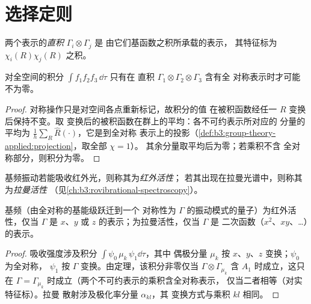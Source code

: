 \section{选择定则}

\begin{definition}[直积]\label{def:b3:group-theory-applied:direct-product}
两个表示的\emph{直积} $\Gamma_i\otimes\Gamma_j$ 是
由它们基函数之积所承载的表示，
其特征标为 $\chi_i(R)\chi_j(R)$ 之积。
\end{definition}

\begin{theorem}[积分为零]\label{thm:b3:group-theory-applied:vanishing-integral}
对全空间的积分 $\int f_1f_2f_3\,\dd\tau$ 只有在
直积 $\Gamma_1\otimes\Gamma_2\otimes\Gamma_3$ 含有全
对称表示时才可能不为零。
\end{theorem}

\begin{proof}
对称操作只是对空间各点重新标记，故积分的值
在被积函数经任一 $R$ 变换后保持不变。取
变换后的被积函数在群上的平均：各不可约表示所对应的
分量的平均为
$\frac1h\sum_R\hat R(\cdot)$，它是到全对称
表示上的投影（\cref{def:b3:group-theory-applied:projection}，取全部 $\chi = 1$）。
其余分量取平均后为零；若乘积不含
全对称部分，则积分为零。
\end{proof}

\begin{definition}\label{def:b3:group-theory-applied:activity}
基频振动若能吸收红外光，则称其为\emph{红外活性}；
若其出现在拉曼光谱中，则称其为\emph{拉曼活性}
（见\cref{ch:b3:rovibrational-spectroscopy}）。
\end{definition}

\begin{corollary}[红外与拉曼选择定则]\label{cor:b3:group-theory-applied:ir-raman}
基频（由全对称的基能级跃迁到一个
对称性为 $\Gamma$ 的振动模式的量子）为红外活性，仅当 $\Gamma$ 是
$x$、$y$ 或 $z$ 的表示；为拉曼活性，仅当 $\Gamma$ 是
二次函数（$x^2$、$xy$、\dots）的表示。
\end{corollary}

\begin{proof}
吸收强度涉及积分 $\int\psi_0\,\mu_k\,\psi_1\dd\tau$，其中
偶极分量 $\mu_k$ 按 $x$、$y$、$z$ 变换；$\psi_0$ 为全对称，
$\psi_1$ 按 $\Gamma$ 变换。由定理，该积分非零仅当
$\Gamma\otimes\Gamma_{\mu_k}$ 含 $A_1$ 时成立，这只在 $\Gamma =
\Gamma_{\mu_k}$ 时成立（两个不可约表示的乘积含全对称表示，
仅当二者相等（对实特征标）。拉曼
散射涉及极化率分量 $\alpha_{kl}$，其
变换方式与乘积 $kl$ 相同。
\end{proof}

